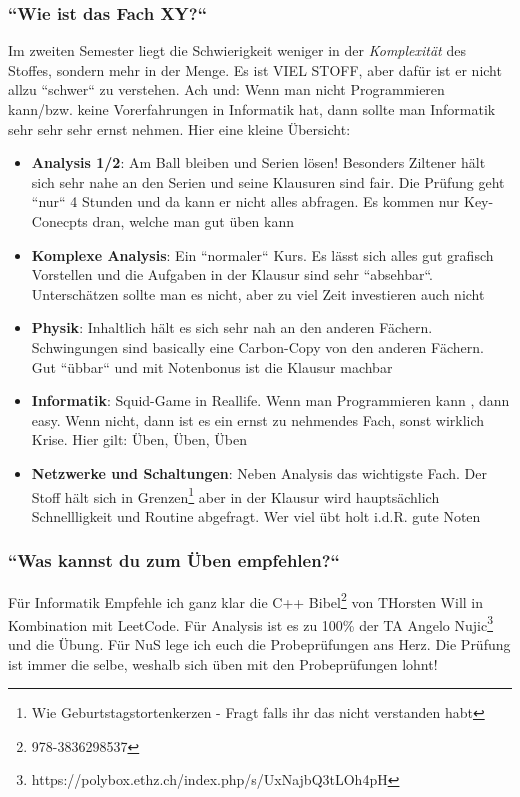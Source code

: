 \documentclass[11pt,a4paper]{article}
\begin{document}
\subsubsection{``Wie ist das Fach XY{?}``}
Im zweiten Semester liegt die Schwierigkeit weniger in der \textit{Komplexität} des Stoffes, sondern mehr in der Menge. Es ist VIEL STOFF, aber dafür ist er nicht allzu ``schwer`` zu verstehen. Ach und: Wenn man nicht Programmieren kann/bzw. keine Vorerfahrungen in Informatik hat, dann sollte man Informatik sehr sehr sehr ernst nehmen. Hier eine kleine Übersicht:

\begin{itemize}
    \item \textbf{Analysis 1/2}: Am Ball bleiben und Serien lösen! Besonders Ziltener hält sich sehr nahe an den Serien und seine Klausuren sind fair. Die Prüfung geht ``nur`` 4 Stunden und da kann er nicht alles abfragen. Es kommen nur Key-Conecpts dran, welche man gut üben kann
    \item \textbf{Komplexe Analysis}: Ein ``normaler`` Kurs. Es lässt sich alles gut grafisch Vorstellen und die Aufgaben in der Klausur sind sehr ``absehbar``. Unterschätzen sollte man es nicht, aber zu viel Zeit investieren auch nicht
    \item \textbf{Physik}: Inhaltlich hält es sich sehr nah an den anderen Fächern. Schwingungen sind basically eine Carbon-Copy von den anderen Fächern. Gut ``übbar`` und mit Notenbonus ist die Klausur machbar
    \item \textbf{Informatik}: Squid-Game in Reallife. Wenn man Programmieren kann , dann easy. Wenn nicht, dann ist es ein ernst zu nehmendes Fach, sonst wirklich Krise. Hier gilt: Üben, Üben, Üben
    \item \textbf{Netzwerke und Schaltungen}: Neben Analysis das wichtigste Fach. Der Stoff hält sich in Grenzen\footnote{Wie Geburtstagstortenkerzen - Fragt falls ihr das nicht verstanden habt} aber in der Klausur wird hauptsächlich Schnellligkeit und Routine abgefragt. Wer viel übt holt i.d.R. gute Noten

\end{itemize}

\subsubsection{``Was kannst du zum Üben empfehlen{?}``}
Für Informatik Empfehle ich ganz klar die C++ Bibel\footnote{978-3836298537} von THorsten Will in Kombination mit LeetCode. Für Analysis ist es zu 100\% der TA Angelo Nujic\footnote{https://polybox.ethz.ch/index.php/s/UxNajbQ3tLOh4pH} und die Übung. Für NuS lege ich euch die Probeprüfungen ans Herz. Die Prüfung ist immer die selbe, weshalb sich üben mit den Probeprüfungen lohnt!
\end{document}
